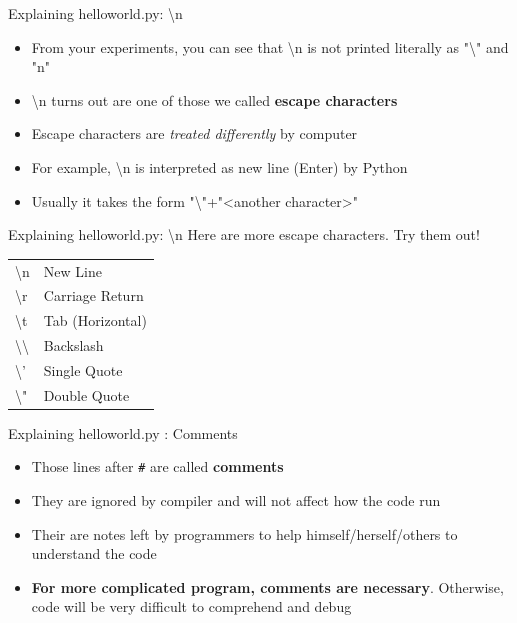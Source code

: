 \documentclass[10pt,xcolor={table,dvipsnames},t]{beamer}
\begin{document}
\begin{frame}{Explaining helloworld.py: \textbackslash n}
  \begin{itemize}
    \item From your experiments, you can see that \textbackslash n is not printed literally as "\textbackslash" and  "n"
    \item \textbackslash n turns out are one of those we called \textbf{escape characters}
    \item Escape characters are \textit{treated differently} by computer 
    \item For example, \textbackslash n is interpreted as new line (Enter) by Python
    \item Usually it takes the form "\textbackslash"+"<another character>"
  \end{itemize}
\end{frame}

\begin{frame}{Explaining helloworld.py: \textbackslash n}
  Here are more escape characters. Try them out!
  \begin{table}[]
    \begin{tabular}{ll}
    \textbackslash{}n                & New Line         \\
    \textbackslash{}r                & Carriage Return  \\
    \textbackslash{}t                & Tab (Horizontal) \\
    \textbackslash{}\textbackslash{} & Backslash        \\
    \textbackslash{}'                & Single Quote     \\
    \textbackslash{}"                & Double Quote    
    \end{tabular}
    \end{table}
\end{frame}

\begin{frame}{Explaining helloworld.py : Comments}
  \begin{itemize}
    \item Those lines after \texttt{\#} are called \textbf{comments}
    \item They are ignored by compiler and will not affect how the code run
    \item Their are notes left by programmers to help himself/herself/others to understand the code 
    \item \textbf{For more complicated program, comments are necessary}. Otherwise, code will be very difficult to comprehend and debug
  \end{itemize}
\end{frame}
\end{document}
